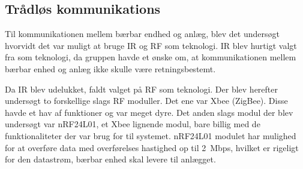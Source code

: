 \subsection{Trådløs kommunikations}

Til kommunikationen mellem bærbar endhed og anlæg, blev det undersøgt hvorvidt det var muligt at bruge IR og RF som teknologi. IR blev hurtigt valgt fra som teknologi, da gruppen havde et ønske om, at kommunikationen mellem bærbar enhed og anlæg ikke skulle være retningsbestemt.  

Da IR blev udelukket, faldt valget på RF som teknologi. Der blev herefter undersøgt to forskellige slags RF moduller. Det ene var Xbee (ZigBee). Disse havde et hav af funktioner og var meget dyre. Det anden slags modul der blev undersøgt var nRF24L01, et Xbee lignende modul, bare billig med de funktionaliteter der var brug for til systemet. nRF24L01 modulet har mulighed for at overføre data med overførelses hastighed op til \SI{2}{Mbps}, hvilket er rigeligt for den datastrøm, bærbar enhed skal levere til anlægget.



